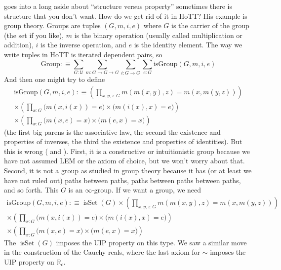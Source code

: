 \documentclass[11pt]{article}
\DeclareMathOperator{\isSet}{isSet}
\newcommand{\real}{\mathbb{R}}
\newcommand{\universe}{\mathcal{U}}
\begin{document}
\citet[about 6 minutes into the 4th lecture]{bauer-hott} goes into a long
aside about ``structure versus property'' sometimes there is structure that
you don't want.  How do we get rid of it in HoTT?  His example is group
theory.  Groups are tuples $(G, m, i, e)$ where $G$ is the carrier of the
group (the set if you like), $m$ is the binary operation (usually called
multiplication or
addition), $i$ is the inverse operation, and $e$ is the identity element.
The way we write tuples in HoTT is iterated dependent pairs, so
\begin{equation*}
   \text{Group} :\equiv
   \sum_{G : \universe}
   \sum_{m : G \to G \to G}
   \sum_{i : G \to G}
   \sum_{e : G}
   \text{isGroup}(G, m, i, e)
\end{equation*}
And then one might try to define
\begin{multline*}
   \text{isGroup}(G, m, i, e) :\equiv
   \left( \prod_{x, y, z : G} m(m(x, y), z) = m(x, m(y, z)) \right)
   \\
   \times
   \left( \prod_{x : G} \bigl( m(x, i(x)) = e \bigr)
   \times \bigl( m(i(x), x) = e \bigr) \right)
   \\
   \times
   \left( \prod_{x : G} \bigl( m(x, e) = x \bigr)
   \times \bigl( m(e, x) = x \bigr) \right)
\end{multline*}
(the first big parens is the associative law, the second the
existence and properties of inverses, the third the
existence and properties of identities).
But this is wrong (\citealp{bauer-hott}
and ).
First, it is a constructive or intuitionistic group because we have not
assumed LEM or the axiom of choice, but we won't worry about that.
Second, it is not a group as studied in group theory because it has (or at
least we have not ruled out) paths between paths, paths between paths between
paths, and so forth.  This $G$ is an $\infty$-group.
If we want a group, we need
\begin{multline*}
   \text{isGroup}(G, m, i, e) :\equiv
   \isSet(G)
   \times
   \left( \prod_{x, y, z : G} m(m(x, y), z) = m(x, m(y, z)) \right)
   \\
   \times
   \left( \prod_{x : G} \bigl( m(x, i(x)) = e \bigr)
   \times \bigl( m(i(x), x) = e \bigr) \right)
   \\
   \times
   \left( \prod_{x : G} \bigl( m(x, e) = x \bigr)
   \times \bigl( m(e, x) = x \bigr) \right)
\end{multline*}
The $\isSet(G)$ imposes the UIP property on this type.
We saw a similar move in the construction of the Cauchy reals, where
the last axiom for $\sim$ imposes the UIP property on $\real_c$.
\end{document}

